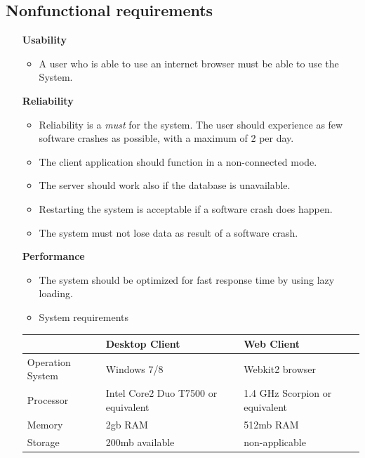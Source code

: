 \subsection{Nonfunctional requirements}

\begin{itemize}

\item[\textbf{Usability}]
\begin{itemize}
\item A user who is able to use an internet browser must be able to use the System.
\end{itemize}

\vspace{0.2cm}
\item[\textbf{Reliability}]
\begin{itemize}
\item Reliability is a \textit{must} for the system. The user should experience as few software crashes as possible, with a maximum of 2 per day.
\item The client application should function in a non-connected mode.
\item The server should work also if the database is unavailable.
\item Restarting the system is acceptable if a software crash does happen.
\item The system must not lose data as result of a software crash.
\end{itemize}


\vspace{0.2cm}
\item[\textbf{Performance}]

\hspace{50cm}

\begin{itemize}
\item The system should be optimized for fast response time by using lazy loading. %
\item System requirements
\end{itemize}


\begin{tabular}{|p{2cm}|p{5cm}|p{5cm}|}
\hline  & Desktop Client & Web Client \\ 
\hline Operation System & Windows 7/8 & Webkit2 browser \\
\hline Processor & Intel Core2 Duo T7500 or equivalent & 1.4 GHz Scorpion or equivalent \\ 
\hline Memory & 2gb RAM & 512mb RAM \\ 
\hline Storage & 200mb available & non-applicable \\ 
\hline 
\end{tabular} 


\end{itemize}
